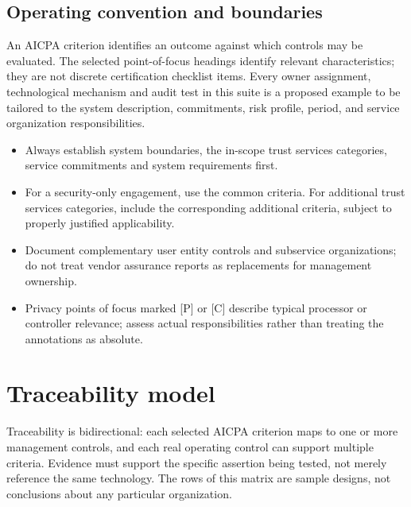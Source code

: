 \documentclass[10pt,oneside]{report}
\begin{document}
\section*{Operating convention and boundaries}
An AICPA criterion identifies an outcome against which controls may be evaluated. The selected point-of-focus headings identify relevant characteristics; they are not discrete certification checklist items. Every owner assignment, technological mechanism and audit test in this suite is a proposed example to be tailored to the system description, commitments, risk profile, period, and service organization responsibilities.

\begin{itemize}
\item Always establish system boundaries, the in-scope trust services categories, service commitments and system requirements first.
\item For a security-only engagement, use the common criteria. For additional trust services categories, include the corresponding additional criteria, subject to properly justified applicability.
\item Document complementary user entity controls and subservice organizations; do not treat vendor assurance reports as replacements for management ownership.
\item Privacy points of focus marked [P] or [C] describe typical processor or controller relevance; assess actual responsibilities rather than treating the annotations as absolute.
\end{itemize}

\chapter{Traceability model}
Traceability is bidirectional: each selected AICPA criterion maps to one or more management controls, and each real operating control can support multiple criteria. Evidence must support the specific assertion being tested, not merely reference the same technology. The rows of this matrix are sample designs, not conclusions about any particular organization.
\end{document}
